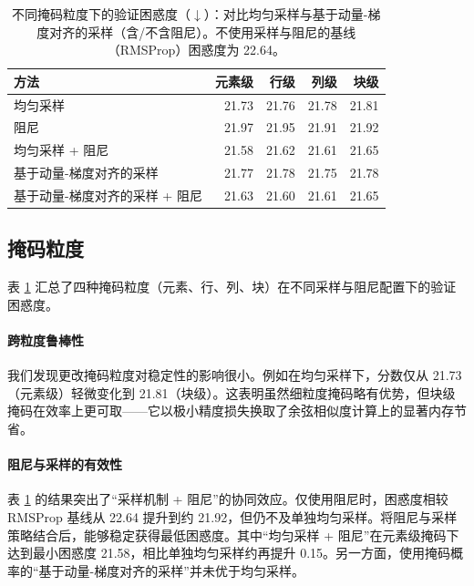 \documentclass[11pt, a4paper, twocolumn, copyright, goog]{google}
\theoremstyle{plain}
\theoremstyle{definition}
\theoremstyle{remark}
\begin{document}
\begin{table}
\caption{不同掩码粒度下的验证困惑度（$\downarrow$）：对比均匀采样与基于动量-梯度对齐的采样（含/不含阻尼）。不使用采样与阻尼的基线（RMSProp）困惑度为 22.64。}
\begin{center}
\begin{tabular}{lrrrr}
\toprule
方法 & 元素级 & 行级 & 列级 & 块级 \\
\midrule  
均匀采样  & 21.73 & 21.76 & 21.78 & 21.81 \\
阻尼 & 21.97 & 21.95 & 21.91 & 21.92 \\
均匀采样 + 阻尼  & 21.58 & 21.62 & 21.61 & 21.65 \\
基于动量-梯度对齐的采样 & 21.77 & 21.78 & 21.75 & 21.78 \\
基于动量-梯度对齐的采样 + 阻尼 & 21.63  & 21.60 & 21.61 & 21.65 \\
\bottomrule
\end{tabular}%
\end{center}
\label{table:masking-granularity}
\end{table}



\subsection{掩码粒度}
表 \ref{table:masking-granularity} 汇总了四种掩码粒度（元素、行、列、块）在不同采样与阻尼配置下的验证困惑度。

\paragraph{跨粒度鲁棒性} 我们发现更改掩码粒度对稳定性的影响很小。例如在均匀采样下，分数仅从 21.73（元素级）轻微变化到 21.81（块级）。这表明虽然细粒度掩码略有优势，但块级掩码在效率上更可取——它以极小精度损失换取了余弦相似度计算上的显著内存节省。




\paragraph{阻尼与采样的有效性} 表 \ref{table:masking-granularity} 的结果突出了“采样机制 + 阻尼”的协同效应。仅使用阻尼时，困惑度相较 RMSProp 基线从 22.64 提升到约 21.92，但仍不及单独均匀采样。将阻尼与采样策略结合后，能够稳定获得最低困惑度。其中“均匀采样 + 阻尼”在元素级掩码下达到最小困惑度 21.58，相比单独均匀采样约再提升 0.15。另一方面，使用掩码概率的“基于动量-梯度对齐的采样”并未优于均匀采样。
\end{document}
